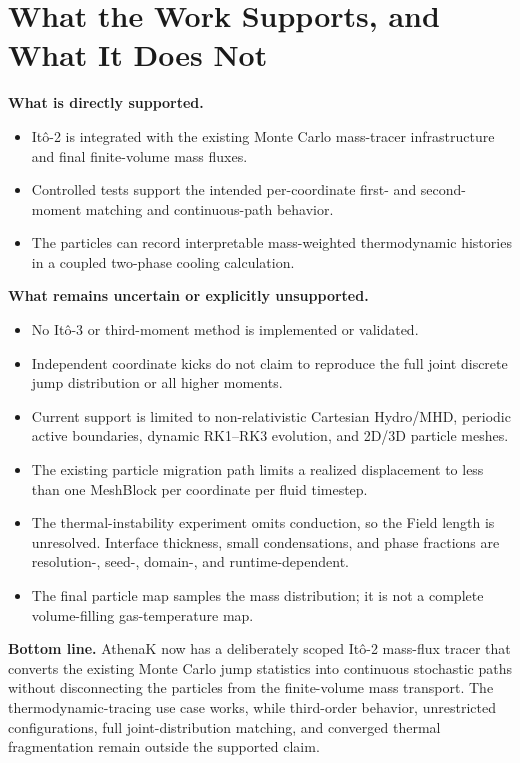\documentclass[11pt]{article}
\newcommand{\Ito}{It\^o}
\newcommand{\AthenaK}{AthenaK}
\begin{document}
\section{What the Work Supports, and What It Does Not}

\textbf{What is directly supported.}
\begin{itemize}
  \item \Ito{}-2 is integrated with the existing Monte Carlo mass-tracer
        infrastructure and final finite-volume mass fluxes.
  \item Controlled tests support the intended per-coordinate first- and
        second-moment matching and continuous-path behavior.
  \item The particles can record interpretable mass-weighted thermodynamic
        histories in a coupled two-phase cooling calculation.
\end{itemize}

\textbf{What remains uncertain or explicitly unsupported.}
\begin{itemize}
  \item No \Ito{}-3 or third-moment method is implemented or validated.
  \item Independent coordinate kicks do not claim to reproduce the full joint
        discrete jump distribution or all higher moments.
  \item Current support is limited to non-relativistic Cartesian Hydro/MHD,
        periodic active boundaries, dynamic RK1--RK3 evolution, and 2D/3D
        particle meshes.
  \item The existing particle migration path limits a realized displacement to
        less than one MeshBlock per coordinate per fluid timestep.
  \item The thermal-instability experiment omits conduction, so the Field
        length is unresolved. Interface thickness, small condensations, and
        phase fractions are resolution-, seed-, domain-, and runtime-dependent.
  \item The final particle map samples the mass distribution; it is not a
        complete volume-filling gas-temperature map.
\end{itemize}

\textbf{Bottom line.} \AthenaK{} now has a deliberately scoped \Ito{}-2
mass-flux tracer that converts the existing Monte Carlo jump statistics into
continuous stochastic paths without disconnecting the particles from the
finite-volume mass transport. The thermodynamic-tracing use case works, while
third-order behavior, unrestricted configurations, full joint-distribution
matching, and converged thermal fragmentation remain outside the supported
claim.
\end{document}
